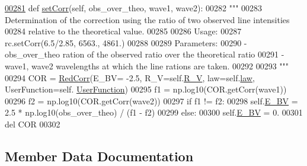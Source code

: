 \begin{DoxyVerb}
\begin{DoxyCode}
\hypertarget{classpyneb_1_1extinction_1_1red__corr_1_1_red_corr_l00281}{}\hyperlink{classpyneb_1_1extinction_1_1red__corr_1_1_red_corr_af46527e15978d583e5d857182b560ce4}{00281}     \textcolor{keyword}{def }\hyperlink{classpyneb_1_1extinction_1_1red__corr_1_1_red_corr_af46527e15978d583e5d857182b560ce4}{setCorr}(self, obs\_over\_theo, wave1, wave2):
00282         \textcolor{stringliteral}{"""}
00283 \textcolor{stringliteral}{        Determination of the correction using the ratio of two observed line intensities }
00284 \textcolor{stringliteral}{            relative to the theoretical value.}
00285 \textcolor{stringliteral}{        }
00286 \textcolor{stringliteral}{        Usage:}
00287 \textcolor{stringliteral}{            rc.setCorr(6.5/2.85, 6563., 4861.)}
00288 \textcolor{stringliteral}{            }
00289 \textcolor{stringliteral}{        Parameters:}
00290 \textcolor{stringliteral}{            - obs\_over\_theo    ration of the observed ratio over the theoretical ratio}
00291 \textcolor{stringliteral}{            - wave1, wave2     wavelengths at which the line rations are taken.}
00292 \textcolor{stringliteral}{}
00293 \textcolor{stringliteral}{        """}
00294         COR = \hyperlink{classpyneb_1_1extinction_1_1red__corr_1_1_red_corr}{RedCorr}(E\_BV= -2.5, R\_V=self.\hyperlink{classpyneb_1_1extinction_1_1red__corr_1_1_red_corr_a4696ecdd84c912c20e6aa19b1573e875}{R\_V}, law=self.\hyperlink{classpyneb_1_1extinction_1_1red__corr_1_1_red_corr_adfed423013315bad4ba5dda2368dc3d0}{law}, UserFunction=self.
      \hyperlink{classpyneb_1_1extinction_1_1red__corr_1_1_red_corr_a41b35235a0952185b3c7e34f6835511e}{UserFunction})
00295         f1 = np.log10(COR.getCorr(wave1))
00296         f2 = np.log10(COR.getCorr(wave2))
00297         \textcolor{keywordflow}{if} f1 != f2:
00298             self.\hyperlink{classpyneb_1_1extinction_1_1red__corr_1_1_red_corr_a0bc581bcaa8eeeb67b83ffdec58bf164}{E\_BV} = 2.5 * np.log10(obs\_over\_theo) / (f1 - f2)
00299         \textcolor{keywordflow}{else}:
00300             self.\hyperlink{classpyneb_1_1extinction_1_1red__corr_1_1_red_corr_a0bc581bcaa8eeeb67b83ffdec58bf164}{E\_BV} = 0.
00301         del COR
00302 
\end{DoxyCode}


\subsection{Member Data Documentation}
\hypertarget{classpyneb_1_1extinction_1_1red__corr_1_1_red_corr_a476840870719872a12ab48a0d1f1a839}{}

\end{DoxyVerb}
